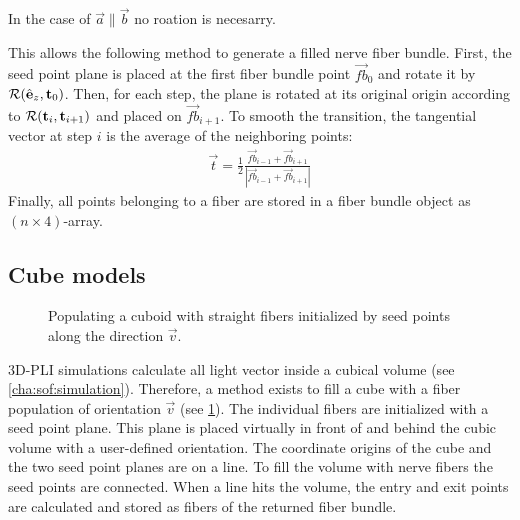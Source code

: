 % 
In the case of $\vec{a} \parallel \vec{b}$ no roation is necesarry.
\par
% 
This allows the following method to generate a filled nerve fiber bundle.
First, the seed point plane is placed at the first fiber bundle point $\vec{fb}_0$ and rotate it by $\mathcal{R}(\hat{\mathbf{e}}_z, \mathbf{t}_0)$.
Then, for each step, the plane is rotated at its original origin according to $\mathcal{R}(\mathbf{t}_i, \mathbf{t}_{i+1})$ and placed on $\vec{fb}_{i+1}$.
To smooth the transition, the tangential vector at step $i$ is the average of the neighboring points:
\begin{align}
    \vec{t} = \frac{1}{2} \frac{\vec{fb}_{i-1} + \vec{fb}_{i+1}}{|\vec{fb}_{i-1} + \vec{fb}_{i+1}|}
\end{align}
%
Finally, all points belonging to a fiber are stored in a fiber bundle object as $(n \times 4)$-array.
%
%
%
\subsection{Cube models} \label{sec:cubeModelBuilding}
%
\begin{figure}[!t]
    \centering
    \setlength{\tikzwidth}{0.5\textwidth}
	\caption{Populating a cuboid with straight fibers initialized by seed points along the direction $\vec{v}$.}
    \label{fig:cubeBuild}%
\end{figure}
%
\ac{3D-PLI} simulations calculate all light vector inside a cubical volume (see \cref{cha:sof:simulation}).
Therefore, a method exists to fill a cube with a fiber population of orientation $\vec{v}$ (see \cref{fig:cubeBuild}).
The individual fibers are initialized with a seed point plane.
This plane is placed virtually in front of and behind the cubic volume with a user-defined orientation.
The coordinate origins of the cube and the two seed point planes are on a line.
To fill the volume with nerve fibers the seed points are connected.
When a line hits the volume, the entry and exit points are calculated and stored as fibers of the returned fiber bundle.
%
%
%
